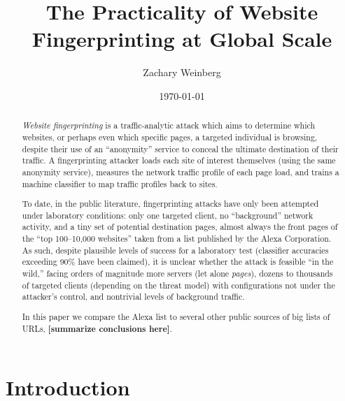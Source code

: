 \documentclass[tinymargin]{zarticle}
\def\todo#1{{\color{todocolor}\bfseries [#1]}}
\begin{document}
\title{The Practicality of Website Fingerprinting at Global Scale}
\author{Zachary Weinberg}
\date{\today}
\maketitle

\begin{abstract}
\textit{Website fingerprinting} is a traffic-analytic attack which
aims to determine which websites, or perhaps even which specific
pages, a targeted individual is browsing, despite their use of an
“anonymity” service to conceal the ultimate destination of their
traffic.  A fingerprinting attacker loads each site of interest
themselves (using the same anonymity service), measures the network
traffic profile of each page load, and trains a machine classifier to
map traffic profiles back to sites.

To date, in the public literature, fingerprinting attacks have only
been attempted under laboratory conditions: only one targeted client,
no “background” network activity, and a tiny set of potential
destination pages, almost always the front pages of the “top
100--10,000 websites” taken from a list published by the Alexa
Corporation.  As such, despite plausible levels of success for a
laboratory test (classifier accuracies exceeding 90\% have been
claimed), it is unclear whether the attack is feasible “in the wild,”
facing orders of magnitude more servers (let alone \emph{pages}),
dozens to thousands of targeted clients (depending on the threat
model) with configurations not under the attacker's control, and
nontrivial levels of background traffic.

In this paper we compare the Alexa list to several other public
sources of big lists of URLs, \todo{summarize conclusions here}.
\end{abstract}

\section{Introduction}
\end{document}
